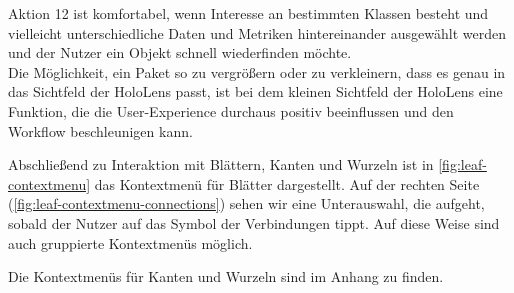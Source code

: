 \noindent Aktion 12 ist komfortabel, wenn Interesse an bestimmten Klassen besteht und vielleicht unterschiedliche Daten und Metriken hintereinander ausgewählt werden und der Nutzer ein Objekt schnell wiederfinden möchte.\\

\noindent Die Möglichkeit, ein Paket so zu vergrößern oder zu verkleinern, dass es genau in das Sichtfeld der HoloLens passt, ist bei dem kleinen Sichtfeld der HoloLens eine Funktion, die die User-Experience durchaus positiv beeinflussen und den Workflow beschleunigen kann.\\

\endgroup

Abschließend zu Interaktion mit Blättern, Kanten und Wurzeln ist in \ref{fig:leaf-contextmenu} das Kontextmenü für  Blätter dargestellt. Auf der rechten Seite (\ref{fig:leaf-contextmenu-connections}) sehen wir eine Unterauswahl, die aufgeht, sobald der Nutzer auf das Symbol der Verbindungen tippt. Auf diese Weise sind auch gruppierte Kontextmenüs möglich.

Die Kontextmenüs für Kanten und Wurzeln sind im Anhang zu finden.

